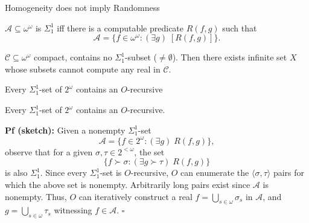 \begin{frame}{Homogeneity does not imply Randomness}
  \begin{center}
  \end{center}

  \begin{define*}
    $\mathcal{A}\subseteq\omega^\omega$ is $\Sigma_1^1$ iff there is a
    computable predicate $R(f,g)$ such that
    \[\mathcal{A} =\{f\in\omega^\omega: (\exists g)\; [R(f,g)]\}.\]
  \end{define*}

  \begin{main-thm*}
    $\mathcal{C}\subseteq\omega^\omega$ compact, contains no
    $\Sigma_1^1$-subset ($\neq\emptyset$). Then there exists infinite set
    $X$ whose subsets cannot compute any real in $\mathcal{C}$.
  \end{main-thm*}
\end{frame}

\begin{frame}{Every $\Sigma_1^1$-set of $2^\omega$ contains an $O$-recursive}
  \begin{fact}
    \label{fact:sigma-contains-O-recursive}
    Every $\Sigma_1^1$-set of $2^\omega$ contains an $O$-recursive.
  \end{fact}

  \textbf{Pf (sketch):} Given a nonempty $\Sigma_1^1$-set
  \[\mathcal{A} =\{f\in2^\omega: (\exists g)\; R(f,g)\},\]
  observe that for a given $\sigma,\tau\in 2^{<\omega}$, the set \[\{f\succ
  \sigma: (\exists g\succ\tau)\; R(f,g)\}\] is also $\Sigma^1_1$. Since
  every $\Sigma^1_1$-set is $O$-recursive, $O$ can enumerate the $\langle
  \sigma,\tau \rangle$ pairs for which the above set is nonempty.
  Arbitrarily long pairs exist since $\mathcal{A}$ is nonempty. Thus, $O$
  can iteratively construct a real $f=\bigcup_{s\in\omega} \sigma_s$ in
  $\mathcal{A}$, and $g=\bigcup_{s\in\omega} \tau_s$ witnessing
  $f\in\mathcal{A}$. $\square$
\end{frame}

